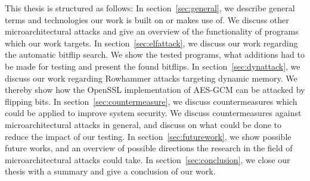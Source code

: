 This thesis is structured as follows: In section~\ref{sec:general}, we describe
general terms and technologies our work is built on or makes use of. We discuss
other microarchitectural attacks and give an overview of the functionality of
programs which our work targets. In section~\ref{sec:elfattack}, we discuss our
work regarding the automatic bitflip search. We show the tested programs, what
additions had to be made for testing and present the found bitflips. In
section~\ref{sec:dynattack}, we discuss our work regarding Rowhammer attacks
targeting dynamic memory. We thereby show how the OpenSSL implementation of
AES-GCM can be attacked by flipping bits. In section~\ref{sec:countermeasure},
we discuss countermeasures which could be applied to improve system security. We
discuss countermeasures against microarchitectural attacks in general, and
discuss on what could be done to reduce the impact of our testing. In
section~\ref{sec:futurework}, we show possible future works, and an overview of
possible directions the research in the field of microarchitectural attacks
could take. In section~\ref{sec:conclusion}, we close our thesis with a summary
and give a conclusion of our work.

